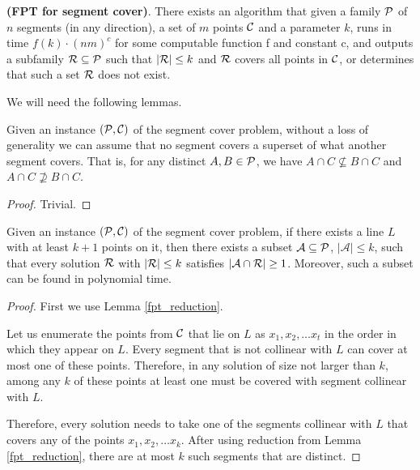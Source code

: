 \label{segments_in_arbitrary_direction}
\begin{tw}{
	\label{segment_cover_fpt}
	\textbf{(FPT for segment cover)}.
	There exists an algorithm that given a family $\mathcal{P}$ of
	$n$ segments (in any direction),
	a set of $m$ points $\mathcal{C}$
	and a parameter $k$,
	runs in time $f(k) \cdot (nm)^c$ for some computable function f and constant c,
	and outputs a subfamily $\mathcal{R} \subseteq \mathcal{P}$
	such that $|\mathcal{R}| \le k$ and $\mathcal{R}$ covers all points in $\mathcal{C}$,
	or determines that such a set $\mathcal{R}$ does not exist.
}\end{tw}

We will need the following lemmas.

\begin{lemma}
   \label{fpt_reduction}
   Given an instance $(\mathcal{P}, \mathcal{C})$ of the segment cover problem,
   without a loss of generality we can assume that
   no segment covers a superset of what another segment covers.
   That is, for any distinct $A, B \in \mathcal{P}$, we have
   $A \cap C \not \subseteq B \cap C$ and $A \cap C \not \supseteq B \cap C$.
\end{lemma}   
   
\begin{proof} Trivial. \end{proof}

\begin{lemma}
	\label{fpt_long_lines}
	Given an instance $(\mathcal{P}, \mathcal{C})$ of the segment cover problem,
	if there exists a line $L$ with at least
	$k+1$ points on it, then there exists a subset $\mathcal{A} \subseteq \mathcal{P}$,
	$|\mathcal{A}| \le k$,
	such that every solution $\mathcal{R}$ with $|\mathcal{R}| \le k$
	satisfies $|\mathcal{A} \cap \mathcal{R}| \ge 1$.
	Moreover, such a subset can be found in polynomial time.
\end{lemma}

\begin{proof}

First we use Lemma \ref{fpt_reduction}.

Let us enumerate the points from $\mathcal{C}$ that lie on $L$ as $x_1, x_2, \ldots x_t$
in the order in which they appear on $L$.
Every segment that is not collinear with $L$ can cover at most one of these
points. Therefore, in any solution of size not larger than $k$,
among any $k$ of these points at least one must
be covered with segment collinear with $L$.

Therefore, every solution needs to take one of the segments collinear
with $L$ that covers any of the points
$x_1, x_2, \ldots x_k$. After using reduction from Lemma \ref{fpt_reduction},
there are at most $k$ such segments that are distinct.
\end{proof}

